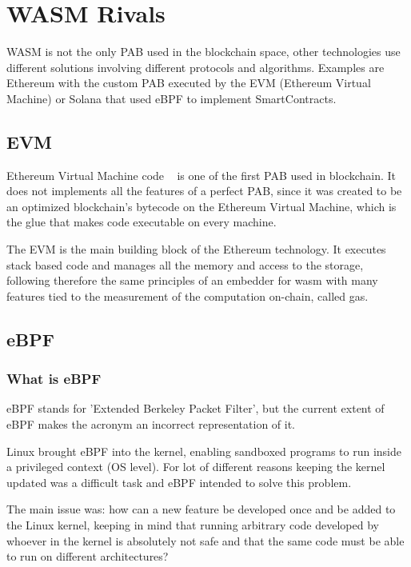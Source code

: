 \documentclass[../main.tex]{subfiles}
\begin{document}
\section{WASM Rivals}

WASM is not the only PAB used in the blockchain space, other technologies use different solutions involving different protocols and algorithms. Examples are Ethereum with the custom PAB executed by the EVM (Ethereum Virtual Machine) or Solana that used eBPF to implement SmartContracts.

\subsection{EVM}

Ethereum Virtual Machine code ~\cite{buterin2014next} is one of the first PAB used in blockchain. It does not implements all the features of a perfect PAB, since it was created to be an optimized blockchain's bytecode on the Ethereum Virtual Machine, which is the glue that makes code executable on every machine.

The EVM is the main building block of the Ethereum technology. It executes stack based code and manages all the memory and access to the storage, following therefore the same principles of an embedder for wasm with many features tied to the measurement of the computation on-chain, called gas.

\subsection{eBPF}

\subsubsection{What is eBPF}

eBPF stands for 'Extended Berkeley Packet Filter', but the current extent of eBPF makes the acronym an incorrect representation of it.

Linux brought eBPF into the kernel, enabling sandboxed programs to run inside a privileged context (OS level). For lot of different reasons keeping the kernel updated was a difficult task and eBPF intended to solve this problem.

The main issue was: how can a new feature be developed once and be added to the Linux kernel, keeping in mind that running arbitrary code developed by whoever in the kernel is absolutely not safe and that the same code must be able to run on different architectures?
\end{document}
